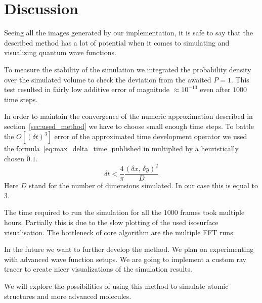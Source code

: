 \section{Discussion}
\label{sec:discussion}

Seeing all the images generated by our implementation, it is safe to say that the described method has a lot of potential when it comes to simulating and visualizing quantum wave functions.

To measure the stability of the simulation we integrated the probability density over the simulated volume to check the deviation from the awaited
$P = 1$.
This test resulted in fairly low additive error of magnitude $\approx 10^{-13}$ even after $1000$ time steps.

In order to maintain the convergence of the numeric approximation described in section~\ref{sec:used_method} we have to choose small enough time steps.
To battle the $O\left[ (\delta{}t)^3 \right]$ error of the approximated time development operator we used the formula~\ref{eq:max_delta_time} published in \cite{mark2020webschrodinger} multiplied by a heuristically chosen $0.1$.
\begin{equation}
	\label{eq:max_delta_time}
	\delta{}t < \frac{4}{\pi} \frac{(\delta{}x,\,\delta{}y)^2}{D}
\end{equation}
Here $D$ stand for the number of dimensions simulated. In our case this is equal to $3$.

The time required to run the simulation for all the $1000$ frames took multiple hours.
Partially this is due to the slow plotting of the used isosurface visualisation.
The bottleneck of core algorithm are the multiple FFT runs.

In the future we want to further develop the method.
We plan on experimenting with advanced wave function setups.
We are going to implement a custom ray tracer to create nicer visualizations of the simulation results.

We will explore the possibilities of using this method to simulate atomic structures and more advanced molecules.



